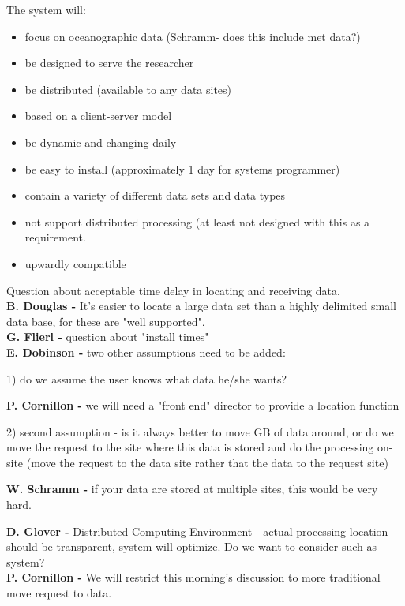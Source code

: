 The system will: 
\begin{itemize}
	\item focus on oceanographic data (Schramm- does this include met
data?)  
	\item be designed to serve the researcher
	\item be distributed (available to any data sites)
	\item based on a client-server model
	\item be dynamic and changing daily
	\item be easy to install (approximately 1 day for systems programmer)
	\item contain a variety of different data sets and data types
	\item not support distributed processing (at least not designed with
this as a requirement.
	\item upwardly compatible
\end{itemize}

Question about acceptable time delay in locating and receiving data.\\
\smallskip
{\bf B. Douglas -} It's easier to locate a large data set than a highly
delimited small data base, for these are "well supported".\\
\smallskip
{\bf G. Flierl -} question about "install times"\\ 
\smallskip
{\bf E. Dobinson -} two other assumptions need to be added:
\begin{description}
	\item{1)} do we assume the user knows what data he/she wants?  

\smallskip
	{\bf P. Cornillon -} we will need a "front end" director to provide a
location function
\smallskip
	\item{2)} second assumption - is it always better to move GB of data
around, or do we move the request to the site where this data is stored and
do the processing on-site (move the request to the data site rather that the
data to the request site)
\end{description}

\medskip
{\bf W. Schramm -} if your data are stored at multiple sites, this would be
very hard. 

\medskip
{\bf D. Glover -} Distributed Computing Environment - actual processing 
location should be transparent, system will optimize.  Do we want to 
consider such as system?\\
{\bf P. Cornillon -} We will restrict this morning's discussion to more 
traditional move request to data.


